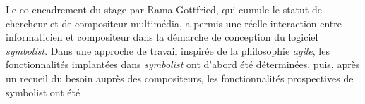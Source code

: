 Le co-encadrement du stage par Rama Gottfried, qui cumule le statut de chercheur et de compositeur multimédia, a permis une réelle interaction entre informaticien et compositeur dans la démarche de conception du logiciel \textit{symbolist}. Dans une approche de travail inspirée de la philosophie \textit{agile}, les fonctionnalités implantées dans \textit{symbolist} ont d'abord été déterminées, puis, après un recueil du besoin auprès des compositeurs, les fonctionnalités prospectives de symbolist ont été 